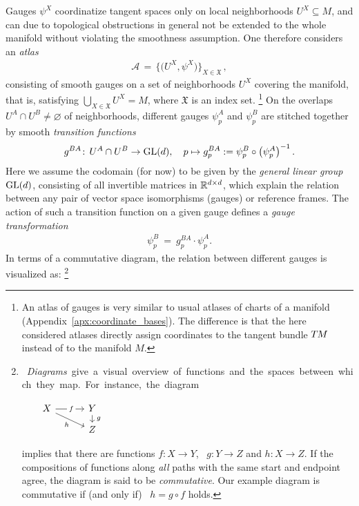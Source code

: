 Gauges $\psi^X$ coordinatize tangent spaces only on local neighborhoods $U^X\subseteq M$, and can due to topological obstructions in general not be extended to the whole manifold without violating the smoothness assumption.
One therefore considers an \emph{atlas}
\begin{align}
    \mathscr{A} \,=\, \big\{\! \big(U^X, \psi^X\big) \!\big\}_{X\in \mathfrak{X}} \,,
\end{align}
consisting of smooth gauges on a set of neighborhoods $U^X$ covering the manifold, that is, satisfying $\bigcup_{X\in \mathfrak{X}} U^X = M$, where $\mathfrak{X}$ is an index set.%
\footnote{
    An atlas of gauges is very similar to usual atlases of charts of a manifold (Appendix~\ref{apx:coordinate_bases}).
    The difference is that the here considered atlases directly assign coordinates to the tangent bundle $T\mkern-1.5muM$ instead of to the manifold $M$.
}
On the overlaps $U^A\cap U^B\neq\varnothing$ of neighborhoods, different gauges $\psi_p^A$ and $\psi_p^B$ are stitched together by smooth \emph{transition functions}%
\begin{align}\label{eq:transition_fct_local_def_21}
    g^{BA}\!:\, U^A\cap U^B\to\operatorname{GL}(d),\quad p \mapsto g_p^{BA} := \psi_p^B \circ \left(\psi_p^A\right)^{-1}.
\end{align}
Here we assume the codomain (for now) to be given by the \emph{general linear group} $\operatorname{GL}(d)$, consisting of all invertible matrices in $ \mathbb{R}^{d\times d}$, which explain the relation between any pair of vector space isomorphisms (gauges) or reference frames.
The action of such a transition function on a given gauge defines a \emph{gauge transformation}
\begin{align}\label{eq:gauge_trafo_local_def_21}
    \psi_p^B\ =\ g_p^{BA} \!\cdot \psi_p^A.
\end{align}
In terms of a commutative diagram, the relation between different gauges is visualized as:%
\footnote{
    \mbox{
        \emph{Diagrams} give a visual overview of functions and the spaces between which they map.
        For instance, the diagram
    }
    \begin{minipage}{.2\textwidth}
    ${
    \mkern30mu
    \begin{tikzcd}[column sep=30pt, row sep=8pt, ampersand replacement=\&]
        X
            \arrow[r, pos=.55, "f" description]
            \arrow[rd, "h\!"']
        \& Y
            \arrow[d, "\;g"]
        \\
        \& Z
    \end{tikzcd}}$
    \end{minipage}
    \hfill
    \begin{minipage}{.8\textwidth}
    implies that there are functions $f:X\to Y$, \ $g:Y\to Z$ and $h:X\to Z$.
    If the compositions of functions along \emph{all} paths with the same start and endpoint agree, the diagram is said to be \emph{commutative}.
    Our example diagram is commutative if (and only if) \ $h = g\circ f$ holds.
    \end{minipage}
}
